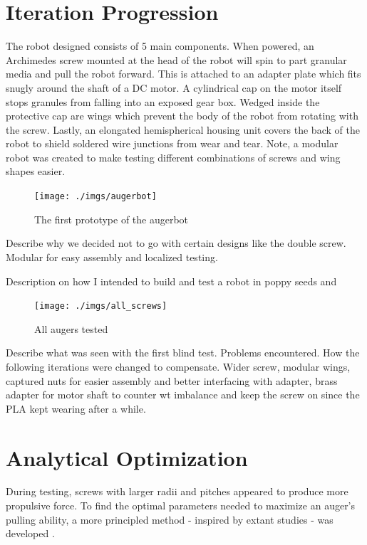 \documentclass[letterpaper, 11 pt]{article}
\begin{document}
\section{Iteration Progression}

The robot designed consists of 5 main components. When powered, an Archimedes screw mounted at the head of the robot will spin to part granular media and pull the robot forward. This is attached to an adapter plate which fits snugly around the shaft of a DC motor. A cylindrical cap on the motor itself stops granules from falling into an exposed gear box. Wedged inside the protective cap are wings which prevent the body of the robot from rotating with the screw. Lastly, an elongated hemispherical housing unit covers the back of the robot to shield soldered wire junctions from wear and tear. Note, a modular robot was created to make testing different combinations of screws and wing shapes easier.

\begin{figure}[H]
\centering
\texttt{[image: ./imgs/augerbot]}
\caption{The first prototype of the augerbot}
\label{fig:augerbot}
\end{figure}

Describe why we decided not to go with certain designs like the double screw. Modular for easy assembly and localized testing.

Description on how I intended to build and test a robot in poppy seeds and 


\begin{figure}[H]
\centering
\texttt{[image: ./imgs/all\_screws]}
\caption{All augers tested}
\label{fig:all_screws}
\end{figure}

Describe what was seen with the first blind test. Problems encountered. 
How the following iterations were changed to compensate. 
Wider screw, modular wings, captured nuts for easier assembly and better interfacing with adapter, brass adapter for motor shaft to counter wt imbalance and keep the screw on since the PLA kept wearing after a while.

\section{Analytical Optimization}
During testing, screws with larger radii and pitches appeared to produce more propulsive force. To find the optimal parameters needed to maximize an auger's pulling ability, a more principled method - inspired by extant studies - was developed \cite{Melo,Chen}.
\end{document}
